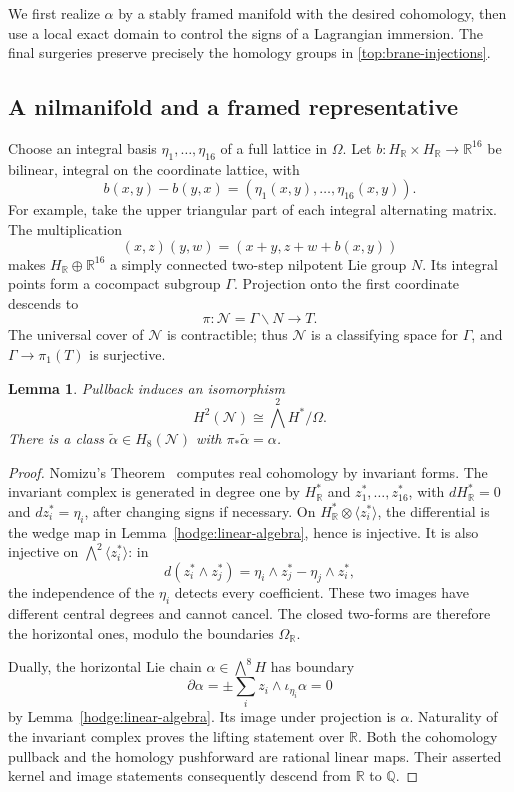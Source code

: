 \documentclass[11pt]{article}
\newtheorem{lemma}[theorem]{Lemma}
\theoremstyle{definition}
\theoremstyle{remark}
\numberwithin{equation}{section}
\begin{document}
We first realize $\alpha$ by a stably framed manifold with the desired
cohomology, then use a local exact domain to control the signs of a
Lagrangian immersion.  The final surgeries preserve precisely the
homology groups in \eqref{top:brane-injections}.

\subsection{A nilmanifold and a framed representative}

Choose an integral basis $\eta_1,\ldots,\eta_{16}$ of a full lattice in
$\Omega$.  Let $b:H_{\mathbb R}\times H_{\mathbb R}\to\mathbb R^{16}$ be bilinear,
integral on the coordinate lattice, with
\[
 b(x,y)-b(y,x)=(\eta_1(x,y),\ldots,\eta_{16}(x,y)).
\]
For example, take the upper triangular part of each integral alternating
matrix.  The multiplication
\[
 (x,z)(y,w)=(x+y,z+w+b(x,y))
\]
makes $H_{\mathbb R}\oplus\mathbb R^{16}$ a simply connected two-step nilpotent
Lie group $N$.  Its integral points form a cocompact subgroup $\Gamma$.
Projection onto the first coordinate descends to
\[
 \pi:\mathcal N=\Gamma\backslash N\longrightarrow T.
\]
The universal cover of $\mathcal N$ is contractible; thus
$\mathcal N$ is a classifying space for $\Gamma$, and
$\Gamma\to\pi_1(T)$ is surjective.

\begin{lemma}\label{top:nilmanifold}
Pullback induces an isomorphism
\[
 H^2(\mathcal N)\cong \bigwedge^2 H^*/\Omega.
\]
There is a class $\widetilde\alpha\in H_8(\mathcal N)$ with
$\pi_*\widetilde\alpha=\alpha$.
\end{lemma}

\begin{proof}
Nomizu's Theorem~\cite[Theorem~1]{nomizu} computes real cohomology by
invariant forms.  The invariant complex is generated in degree one by
$H^*_{\mathbb R}$ and $z_1^*,\ldots,z_{16}^*$, with
$dH^*_{\mathbb R}=0$ and $dz_i^*=\eta_i$, after changing signs if necessary.
On $H^*_{\mathbb R}\otimes\langle z_i^*\rangle$, the differential is the
wedge map in Lemma~\ref{hodge:linear-algebra}, hence is injective.
It is also injective on $\bigwedge^2\langle z_i^*\rangle$: in
\[
 d(z_i^*\wedge z_j^*)=\eta_i\wedge z_j^*-\eta_j\wedge z_i^*,
\]
the independence of the $\eta_i$ detects every coefficient.  These two
images have different central degrees and cannot cancel.  The closed
two-forms are therefore the horizontal ones, modulo the boundaries
$\Omega_{\mathbb R}$.

Dually, the horizontal Lie chain $\alpha\in\bigwedge^8H$ has boundary
\[
 \partial\alpha=\pm\sum_i z_i\wedge\iota_{\eta_i}\alpha=0
\]
by Lemma~\ref{hodge:linear-algebra}.  Its image under projection is
$\alpha$.  Naturality of the invariant complex proves the lifting
statement over $\mathbb R$.  Both the cohomology pullback and the homology
pushforward are rational linear maps.  Their asserted kernel and image
statements consequently descend from $\mathbb R$ to $\mathbb Q$.
\end{proof}
\end{document}
